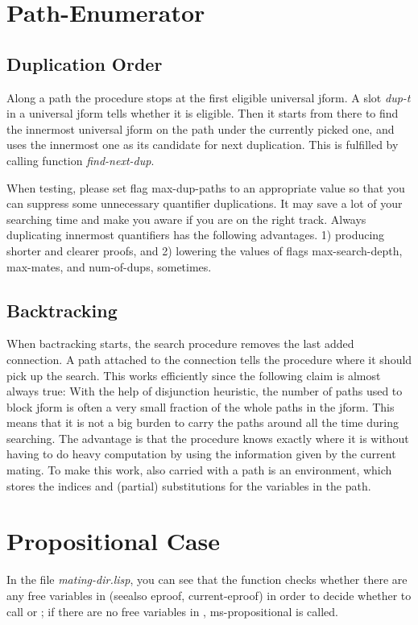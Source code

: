 \section{Path-Enumerator}

\subsection{Duplication Order}
Along a path the procedure stops at the first eligible universal
jform. A slot {\it dup-t} in a universal jform tells whether it is
eligible. Then it starts from there to find the innermost
universal jform on the path under the currently picked one, and 
uses the innermost one as its candidate for next duplication. This
is fulfilled by calling function {\it find-next-dup}.

When testing, please set flag max-dup-paths to an appropriate value
so that you can suppress some unnecessary quantifier duplications.
It may save a lot of your searching time and make you aware if
you are on the right track. Always duplicating innermost quantifiers
has the following advantages.
1) producing shorter and clearer proofs, and
2) lowering the values of flags max-search-depth, max-mates, and num-of-dups,
sometimes.

\subsection{Backtracking}
When bactracking starts, the search procedure removes the
last added connection. A path attached to the connection tells
the procedure where it should pick up the search. This works
efficiently since the following claim is almost always true:
With the help of disjunction heuristic, the number of paths
used to block jform is often a very small fraction of the
whole paths in the jform. This means that it is not a big
burden to carry the paths around all the time during searching.
The advantage is that the procedure knows exactly where it is
without having to do heavy computation by using the information
given by the current mating. To make this work, also carried with a path
is an environment, which stores the indices and (partial) substitutions
for the variables in the path.

\section{Propositional Case}
In the file {\it mating-dir.lisp}, you can see that the function 
checks whether there are any free variables in 
(seealso eproof, current-eproof)
in order to decide whether to call  or 
;
if there are no free variables in , ms-propositional is
called.

